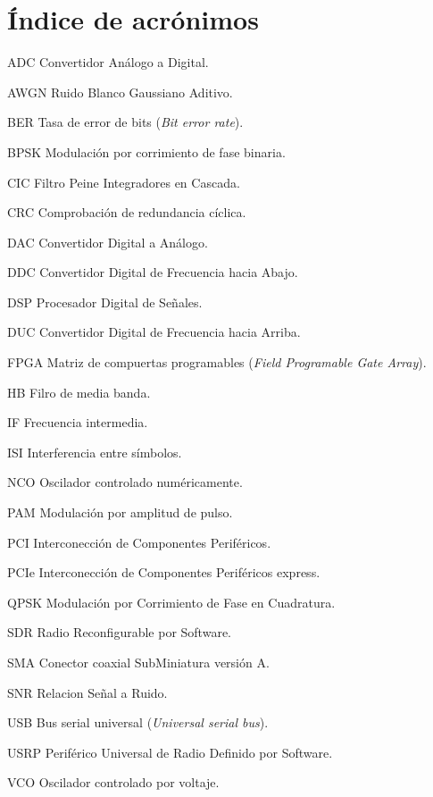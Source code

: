 \chapter*{\'Indice de acr\'onimos}
%

\begin{symbollist*}

\item[ADC]  Convertidor An\'alogo a Digital.
\item[AWGN] Ruido Blanco Gaussiano Aditivo.
\item[BER]  Tasa de error de bits (\emph{Bit error rate}).
\item[BPSK] Modulaci\'on por corrimiento de fase binaria.
\item[CIC]  Filtro Peine Integradores en Cascada.
\item[CRC]  Comprobaci\'on de redundancia c\'iclica.
\item[DAC]  Convertidor Digital a An\'alogo.
\item[DDC]  Convertidor Digital de Frecuencia hacia Abajo.
\item[DSP]  Procesador Digital de Se\~nales.
\item[DUC]  Convertidor Digital de Frecuencia hacia Arriba.
\item[FPGA] Matriz de compuertas programables (\emph{Field Programable Gate Array}).
\item[HB]   Filro de media banda.
\item[IF]   Frecuencia intermedia.
\item[ISI]  Interferencia entre s\'imbolos.
\item[NCO]  Oscilador controlado num\'ericamente.
\item[PAM]  Modulaci\'on por amplitud de pulso.
\item[PCI]  Interconecci\'on de Componentes Perif\'ericos.
\item[PCIe] Interconecci\'on de Componentes Perif\'ericos express.
\item[QPSK] Modulaci\'on por Corrimiento de Fase en Cuadratura.
\item[SDR]  Radio Reconfigurable por Software.
\item[SMA]  Conector coaxial SubMiniatura versi\'on A.
\item[SNR]  Relacion Se\~nal a Ruido.
\item[USB]  Bus serial universal (\emph{Universal serial bus}).
\item[USRP] Perif\'erico Universal de Radio Definido por Software.
\item[VCO]  Oscilador controlado por voltaje.

\end{symbollist*}